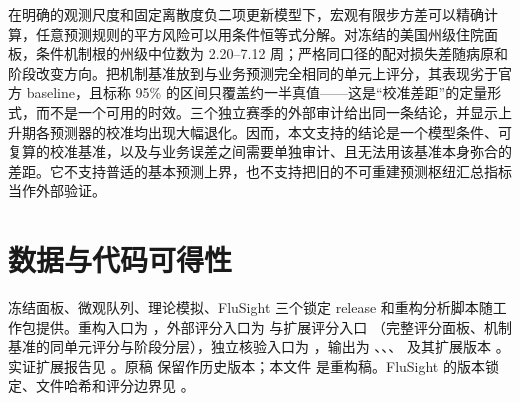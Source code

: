 \documentclass[11pt,a4paper]{article}
\begin{document}
在明确的观测尺度和固定离散度负二项更新模型下，宏观有限步方差可以精确计算，任意预测规则的平方风险可以用条件恒等式分解。对冻结的美国州级住院面板，条件机制根的州级中位数为 2.20--7.12 周；严格同口径的配对损失差随病原和阶段改变方向。把机制基准放到与业务预测完全相同的单元上评分，其表现劣于官方 baseline，且标称 95\% 的区间只覆盖约一半真值——这是“校准差距”的定量形式，而不是一个可用的时效。三个独立赛季的外部审计给出同一条结论，并显示上升期各预测器的校准均出现大幅退化。因而，本文支持的结论是一个模型条件、可复算的校准基准，以及与业务误差之间需要单独审计、且无法用该基准本身弥合的差距。它不支持普适的基本预测上界，也不支持把旧的不可重建预测枢纽汇总指标当作外部验证。

\section*{数据与代码可得性}

冻结面板、微观队列、理论模拟、FluSight 三个锁定 release 和重构分析脚本随工作包提供。重构入口为 ，外部评分入口为  与扩展评分入口 （完整评分面板、机制基准的同单元评分与阶段分层），独立核验入口为 ，输出为 、、、 及其扩展版本 。实证扩展报告见 。原稿  保留作历史版本；本文件  是重构稿。FluSight 的版本锁定、文件哈希和评分边界见 。



\end{document}

